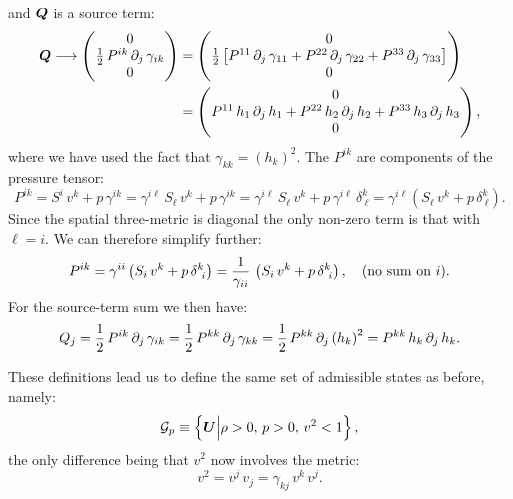 and $\bQ$ is a source term:
\begin{align}
    \bQ\longrightarrow\begin{pmatrix}0\\\f{1}{2}\,P^{ik}\,\pd{\,\gamma_{ik}}{j}\\0\end{pmatrix}&=\begin{pmatrix}0\\ \f{1}{2}\left[P^{11}\,\pd{\,\gamma_{11}}{j}+P^{22}\,\pd{\,\gamma_{22}}{j}+P^{33}\,\pd{\,\gamma_{33}}{j}\right] \\0\end{pmatrix}\\
    &=\begin{pmatrix}0\\ P^{11}\,h_{1}\,\pd{\,h_{1}}{j}+P^{22}\,h_{2}\,\pd{\,h_{2}}{j}+P^{33}\,h_{3}\,\pd{\,h_{3}}{j} \\0\end{pmatrix},
\end{align}
where we have used the fact that $\gamma_{kk}=\left(h_{k}\right)^{2}$. The $P^{ik}$ are components of the pressure tensor:
\begin{equation}
    P^{ik}=S^{i}\,v^{k}+p\,\gamma^{ik}=\gamma^{i\ell}\,S_{\ell}\,v^{k}+p\,\gamma^{ik}=\gamma^{i\ell}\,S_{\ell}\,v^{k}+p\,\gamma^{i\ell}\,\delta^{k}_{~\ell}=\gamma^{i\ell}\left(S_{\ell}\,v^{k}+p\,\delta^{k}_{~\ell}\right).
\end{equation}
Since the spatial three-metric is diagonal the only non-zero term is that with $\ell=i$. We can therefore simplify further:
\begin{equation}
    P^{ik}=\gamma^{ii}\left(S_{i}\,v^{k}+p\,\delta^{k}_{~i}\right)=\f{1}{\gamma_{ii}}\,\left(S_{i}\,v^{k}+p\,\delta^{k}_{~i}\right),\hspace{1em}\text{(no sum on $i$)}.
\end{equation}
For the source-term sum we then have:
\begin{equation}\label{Eq:PressureTensorSum}
    Q_{j}=\f{1}{2}\,P^{ik}\,\p_{j}\,\gamma_{ik}=\f{1}{2}\,P^{kk}\,\p_{j}\,\gamma_{kk}=\f{1}{2}\,P^{kk}\,\p_{j}\left(h_{k}\right)^{2}=P^{kk}\,h_{k}\,\p_{j}\,h_{k}.
\end{equation}

These definitions lead us to define the same set of admissible states as before, namely:
\begin{equation}
    \cG_{p}\equiv\left\{\bU\Big|\rho>0,\,p>0,\,v^{2}<1\right\},
\end{equation}
the only difference being that $v^{2}$ now involves the metric:
\begin{equation}
    v^{2}=v^{j}\,v_{j}=\gamma_{kj}\,v^{k}\,v^{j}.
\end{equation}

